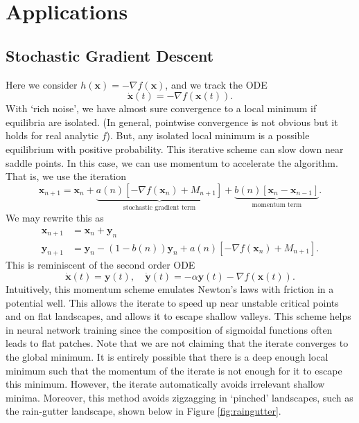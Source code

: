 \section{Applications}

\subsection{Stochastic Gradient Descent}

Here we consider $h(\mathbf{x}) = -\nabla f(\mathbf{x})$, and we track the ODE
\[
    \dot{\mathbf{x}}(t) = -\nabla f(\mathbf{x}(t)).
\]
With `rich noise', we have almost sure convergence to a local minimum if equilibria are isolated. (In general, pointwise convergence is not obvious but it holds for real analytic $f$). But, any isolated local minimum is a possible equilibrium with positive probability. This iterative scheme can slow down near saddle points. In this case, we can use momentum to accelerate the algorithm. That is, we use the iteration
\[
    \mathbf{x}_{n+1} = \mathbf{x}_n + \underbrace{a(n) \left[ -\nabla f(\mathbf{x}_n) + M_{n+1} \right]}_{\text{stochastic gradient term}} + \underbrace{b(n) \left[ \mathbf{x}_n - \mathbf{x}_{n-1} \right]}_{\text{momentum term}}.
\]
We may rewrite this as
\begin{align*}
    \mathbf{x}_{n+1} &= \mathbf{x}_n + \mathbf{y}_n \\
    \mathbf{y}_{n+1} &= \mathbf{y}_n - (1-b(n))\mathbf{y}_n + a(n) \left[ -\nabla f(\mathbf{x}_n) + M_{n+1} \right].
\end{align*}
This is reminiscent of the second order ODE
\[
    \dot{\mathbf{x}}(t) = \mathbf{y}(t), \quad \dot{\mathbf{y}}(t) = -\alpha \mathbf{y}(t) - \nabla f(\mathbf{x}(t)).
\]
Intuitively, this momentum scheme emulates Newton's laws with friction in a potential well. This allows the iterate to speed up near unstable critical points and on flat landscapes, and allows it to escape shallow valleys. This scheme helps in neural network training since the composition of sigmoidal functions often leads to flat patches. Note that we are not claiming that the iterate converges to the global minimum. It is entirely possible that there is a deep enough local minimum such that the momentum of the iterate is not enough for it to escape this minimum. However, the iterate automatically avoids irrelevant shallow minima. Moreover, this method avoids zigzagging in `pinched' landscapes, such as the rain-gutter landscape, shown below in Figure \ref{fig:raingutter}.

